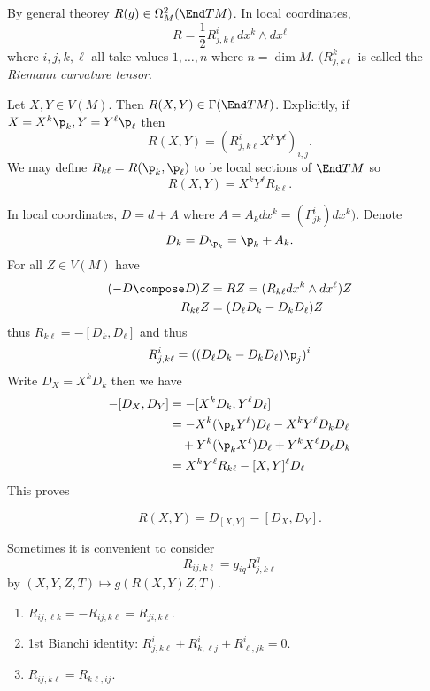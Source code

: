 \documentclass[a4paper]{article}
\newcommand{\w}{\wedge}
\begin{document}
By general theorey \(R(g) \in \Omega_M^2(\End TM)\). In local coordinates,
\[
  R = \frac{1}{2} R^i_{j, k \ell} dx^k \w dx^\ell
\]
where \(i, j, k, \ell\) all take values \(1, \dots, n\) where \(n = \dim M\). \((R^k_{j, k \ell}\) is called the \emph{Riemann curvature tensor}.

Let \(X, Y \in V(M)\). Then \(R(X, Y) \in \Gamma(\End TM)\). Explicitly, if \(X = X^k \p_k, Y = Y^\ell \p_\ell\) then
\[
  R(X, Y) = (R^i_{j, k \ell} X^k Y^\ell)_{i, j}.
\]
We may define \(R_{k\ell} = R(\p_k, \p_\ell)\) to be local sections of \(\End TM\) so
\[
  R(X, Y) = X^k Y^\ell R_{k\ell}.
\]

In local coordinates, \(D = d + A\) where \(A = A_k dx^k = (\Gamma^i_{jk}) dx^k)\). Denote
\[
  D_k = D_{\p_k} = \p_k + A_k.
\]
For all \(Z \in V(M)\) have
\begin{align*}
  (- D \compose D) Z &= RZ = (R_{k \ell} dx^k \wedge dx^\ell) Z \\
  R_{k \ell} Z &= (D_\ell D_k - D_k D_\ell) Z
\end{align*}
thus \(R_{k \ell} = - [D_k, D_\ell]\) and thus
\[
  R^i_{j, k \ell} = ((D_\ell D_k - D_k D_\ell) \p_j)^i
\]
Write \(D_X = X^kD_k\) then we have
\begin{align*}
  -[D_X, D_Y]
  &= -[X^kD_k, Y^\ell D_\ell] \\
  &= - X^k (\p_k Y^\ell) D_\ell - X^k Y^\ell D_k D_\ell \\
  &\quad+ Y^k (\p_k X^\ell) D_\ell + Y^k X^\ell D_\ell D_k \\
  &= X^k Y^\ell R_{k \ell} - [X, Y]^\ell D_\ell
\end{align*}
This proves

\begin{lemma}
  \[
    R(X, Y) = D_{[X, Y]} - [D_X, D_Y].
  \]
\end{lemma}

Sometimes it is convenient to consider
\[
  R_{ij, k \ell} = g_{iq} R^q_{j, k\ell}
\]
by \((X, Y, Z, T) \mapsto g(R(X, Y)Z, T)\).

\begin{proposition}\leavevmode
  \begin{enumerate}
  \item \(R_{ij, \ell k} = - R_{ij, k\ell} = R_{ji, k \ell}\).
  \item 1st Bianchi identity: \(R^i_{j, k \ell} + R^i_{k, \ell j} + R^i_{\ell, jk} = 0\).
  \item \(R_{ij, k \ell} = R_{k \ell, ij}\). 
  \end{enumerate}
\end{proposition}
\end{document}
